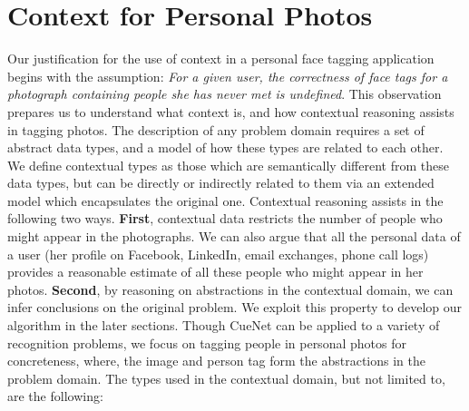 

\section{Context for Personal Photos}
Our justification for the use of context in a personal face tagging application begins with the assumption: \textit{For a given user, the correctness of face tags for a photograph containing people she has never met is undefined}. This observation prepares us to understand what context is, and how contextual reasoning assists in tagging photos. The description of any problem domain requires a set of abstract data types, and a model of how these types are related to each other. We define contextual types as those which are semantically different from these data types, but can be directly or indirectly related to them via an extended model which encapsulates the original one. Contextual reasoning assists in the following two ways. \textbf{First}, contextual data restricts the number of people who might appear in the photographs. We can also argue that all the personal data of a user (her profile on Facebook, LinkedIn, email exchanges, phone call logs) provides a reasonable estimate of all these people who might appear in her photos. \textbf{Second}, by reasoning on abstractions in the contextual domain, we can infer conclusions on the original problem. We exploit this property to develop our algorithm in the later sections. Though CueNet can be applied to a variety of recognition problems, we focus on tagging people in personal photos for concreteness, where, the image and person tag form the abstractions in the problem domain. The types used in the contextual domain, but not limited to, are the following:

